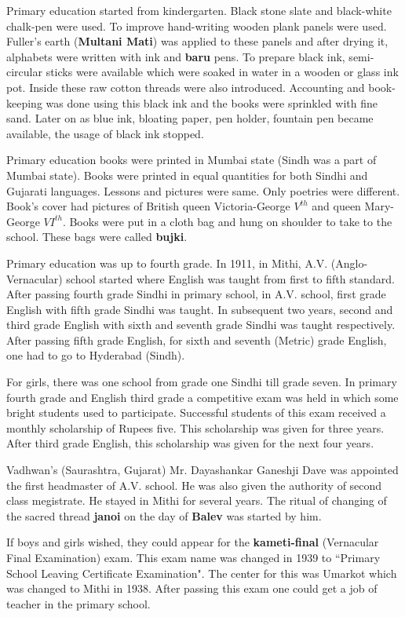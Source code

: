 Primary education started from kindergarten. Black stone slate and black-white
chalk-pen were used. To improve hand-writing wooden plank panels were used.
Fuller's earth (\textbf{Multani Mati}) was applied to these panels and after
drying it, alphabets were written with ink and \textbf{baru} pens. To prepare
black ink, semi-circular sticks were available which were soaked in water in a
wooden or glass ink pot. Inside these raw cotton threads were also introduced.
Accounting and book-keeping was done using this black ink and the books were
sprinkled with fine sand. Later on as blue ink, bloating paper, pen holder,
fountain pen became available, the usage of black ink stopped.

Primary education books were printed in Mumbai state (Sindh was a part of Mumbai
state). Books were printed in equal quantities for both Sindhi and Gujarati
languages. Lessons and pictures were same. Only poetries were different. Book's
cover had pictures of British queen Victoria-George $V^{th}$ and queen Mary-George
$VI^{th}$. Books were put in a cloth bag and hung on shoulder to take to the school.
These bags were called \textbf{bujki}.

Primary education was up to fourth grade. In 1911, in Mithi, A.V.
(Anglo-Vernacular) school started where English was taught from first to fifth
standard. After passing fourth grade Sindhi in primary school, in A.V. school,
first grade English with fifth grade Sindhi was taught. In subsequent two years,
second and third grade English with sixth and seventh grade Sindhi was taught
respectively. After passing fifth grade English, for sixth and seventh (Metric)
grade English, one had to go to Hyderabad (Sindh).

For girls, there was one school from grade one Sindhi till grade seven. In
primary fourth grade and English third grade a competitive exam was held in
which some bright students used to participate. Successful students of this exam
received a monthly scholarship of Rupees five. This scholarship was given for
three years. After third grade English, this scholarship was given for the next
four years.

Vadhwan's (Saurashtra, Gujarat) Mr. Dayashankar Ganeshji Dave was appointed the
first headmaster of A.V. school. He was also given the authority of second class
megistrate. He stayed in Mithi for several years. The ritual of changing of the sacred thread
\textbf{janoi} on the day of \textbf{Balev} was started by him.

If boys and girls wished, they could appear for the \textbf{kameti-final}
(Vernacular Final Examination) exam. This exam name was changed in 1939 to
``Primary School Leaving Certificate Examination". The center for this was
Umarkot which was changed to Mithi in 1938. After passing this exam one could
get a job of teacher in the primary school.

